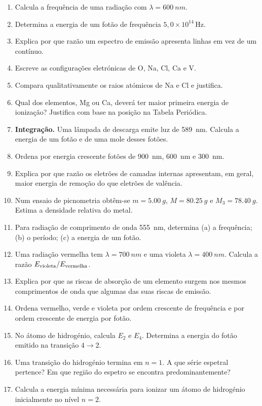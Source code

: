 \documentclass[11pt,a4paper,oneside]{book}
\begin{document}
\begin{exercicios}
\begin{enumerate}
  \item Calcula a frequência de uma radiação com $\lambda=\SI{600}{nm}$.
  \item Determina a energia de um fotão de frequência $5{,}0\times10^{14}\,\mathrm{Hz}$.
  \item Explica por que razão um espectro de emissão apresenta linhas em vez de um contínuo.
  \item Escreve as configurações eletrónicas de O, Na, Cl, Ca e V.
  \item Compara qualitativamente os raios atómicos de Na e Cl e justifica.
  \item Qual dos elementos, Mg ou Ca, deverá ter maior primeira energia de ionização? Justifica com base na posição na Tabela Periódica.
  \item \textbf{Integração.} Uma lâmpada de descarga emite luz de \SI{589}{nm}. Calcula a energia de um fotão e de uma mole desses fotões.
  \item Ordena por energia crescente fotões de \SI{900}{nm}, \SI{600}{nm} e \SI{300}{nm}.
  \item Explica por que razão os eletrões de camadas internas apresentam, em geral, maior energia de remoção do que eletrões de valência.
  \item Num ensaio de picnometria obtêm-se $m=\SI{5.00}{g}$, $M=\SI{80.25}{g}$ e $M_3=\SI{78.40}{g}$. Estima a densidade relativa do metal.
  \item Para radiação de comprimento de onda \SI{555}{nm}, determina (a) a frequência; (b) o período; (c) a energia de um fotão.
  \item Uma radiação vermelha tem $\lambda=\SI{700}{nm}$ e uma violeta $\lambda=\SI{400}{nm}$. Calcula a razão $E_{\rm violeta}/E_{\rm vermelha}$.
  \item Explica por que as riscas de absorção de um elemento surgem nos mesmos comprimentos de onda que algumas das suas riscas de emissão.
  \item Ordena vermelho, verde e violeta por ordem crescente de frequência e por ordem crescente de energia por fotão.
  \item No átomo de hidrogénio, calcula $E_2$ e $E_4$. Determina a energia do fotão emitido na transição $4\rightarrow2$.
  \item Uma transição do hidrogénio termina em $n=1$. A que série espetral pertence? Em que região do espetro se encontra predominantemente?
  \item Calcula a energia mínima necessária para ionizar um átomo de hidrogénio inicialmente no nível $n=2$.

\end{enumerate}
\end{exercicios}
\end{document}
